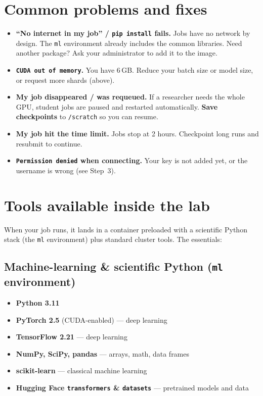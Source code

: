 \documentclass[11pt]{article}
\newcommand{\ShardMem}{6\,GB}                          %
\newcommand{\MaxTime}{2 hours}                         %
\newcommand{\code}[1]{\texttt{#1}}
\begin{document}
\section{Common problems and fixes}
\begin{itemize}
  \item \textbf{``No internet in my job'' / \code{pip install} fails.} Jobs have no network by design. The \code{ml} environment already includes the common libraries. Need another package? Ask your administrator to add it to the image.
  \item \textbf{\code{CUDA out of memory}.} You have \ShardMem. Reduce your batch size or model size, or request more shards (above).
  \item \textbf{My job disappeared / was requeued.} If a researcher needs the whole GPU, student jobs are paused and restarted automatically. \textbf{Save checkpoints} to \code{/scratch} so you can resume.
  \item \textbf{My job hit the time limit.} Jobs stop at \MaxTime. Checkpoint long runs and resubmit to continue.
  \item \textbf{\code{Permission denied} when connecting.} Your key is not added yet, or the username is wrong (see Step~3).
\end{itemize}

\section{Tools available inside the lab}
When your job runs, it lands in a container preloaded with a scientific Python stack (the \code{ml} environment) plus standard cluster tools. The essentials:

\subsection*{Machine-learning \& scientific Python (\texttt{ml} environment)}
\begin{itemize}[itemsep=1pt]
  \item \textbf{Python 3.11}
  \item \textbf{PyTorch 2.5} (CUDA-enabled) --- deep learning
  \item \textbf{TensorFlow 2.21} --- deep learning
  \item \textbf{NumPy, SciPy, pandas} --- arrays, math, data frames
  \item \textbf{scikit-learn} --- classical machine learning
  \item \textbf{Hugging Face \code{transformers} \& \code{datasets}} --- pretrained models and data
\end{itemize}
\end{document}
